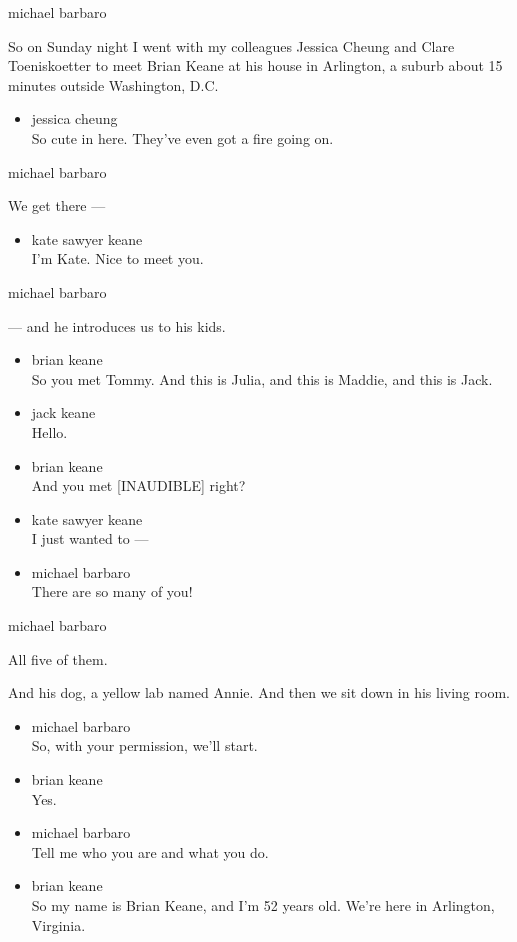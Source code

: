 michael barbaro

So on Sunday night I went with my colleagues Jessica Cheung and Clare
Toeniskoetter to meet Brian Keane at his house in Arlington, a suburb
about 15 minutes outside Washington, D.C.

\begin{itemize}
\tightlist
\item
  jessica cheung\\
  So cute in here. They've even got a fire going on.
\end{itemize}

michael barbaro

We get there ---

\begin{itemize}
\tightlist
\item
  kate sawyer keane\\
  I'm Kate. Nice to meet you.
\end{itemize}

michael barbaro

--- and he introduces us to his kids.

\begin{itemize}
\item
  brian keane\\
  So you met Tommy. And this is Julia, and this is Maddie, and this is
  Jack.
\item
  jack keane\\
  Hello.
\item
  brian keane\\
  And you met {[}INAUDIBLE{]} right?
\item
  kate sawyer keane\\
  I just wanted to ---
\item
  michael barbaro\\
  There are so many of you!
\end{itemize}

michael barbaro

All five of them.

And his dog, a yellow lab named Annie. And then we sit down in his
living room.

\begin{itemize}
\item
  michael barbaro\\
  So, with your permission, we'll start.
\item
  brian keane\\
  Yes.
\item
  michael barbaro\\
  Tell me who you are and what you do.
\item
  brian keane\\
  So my name is Brian Keane, and I'm 52 years old. We're here in
  Arlington, Virginia.
\end{itemize}

